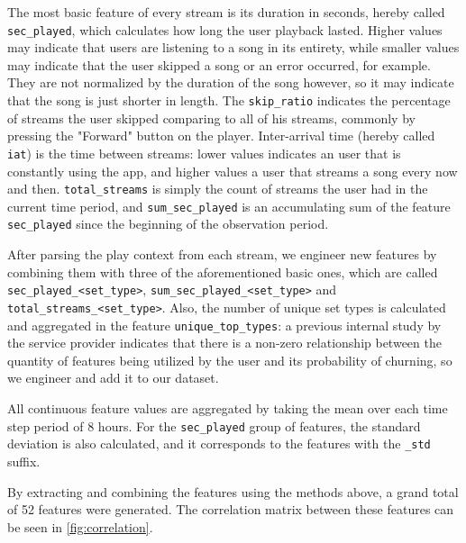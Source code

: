 \documentclass{kththesis}
\begin{document}
The most basic feature of every stream is its duration in seconds, hereby called \verb|sec_played|, which calculates how long the user playback lasted. Higher values may indicate that users are listening to a song in its entirety, while smaller values may indicate that the user skipped a song or an error occurred, for example. They are not normalized by the duration of the song however, so it may indicate that the song is just shorter in length. The \verb|skip_ratio| indicates the percentage of streams the user skipped comparing to all of his streams, commonly by pressing the "Forward" button on the player. Inter-arrival time (hereby called \verb|iat|) is the time between streams: lower values indicates an user that is constantly using the app, and higher values a user that streams a song every now and then. \verb|total_streams| is simply the count of streams the user had in the current time period, and \verb|sum_sec_played| is an accumulating sum of the feature \verb|sec_played| since the beginning of the observation period. 

After parsing the play context from each stream, we engineer new features by combining them with three of the aforementioned basic ones, which are called \verb|sec_played_<set_type>|, \verb|sum_sec_played_<set_type>| and \verb|total_streams_<set_type>|. Also, the number of unique set types is calculated and aggregated in the feature \verb|unique_top_types|: a previous internal study by the service provider indicates that there is a non-zero relationship between the quantity of features being utilized by the user and its probability of churning, so we engineer and add it to our dataset.

All continuous feature values are aggregated by taking the mean over  each time step period of 8 hours. For the \verb|sec_played| group of features, the standard deviation is also calculated, and it corresponds to the features with the \verb|_std| suffix.

By extracting and combining the features using the methods above, a grand total of 52 features were generated. The correlation matrix between these features can be seen in \autoref{fig:correlation}.
\end{document}
